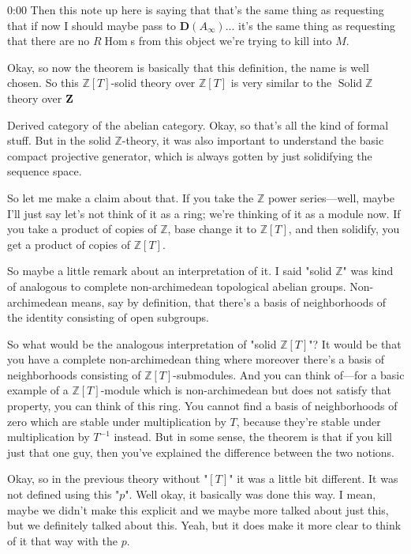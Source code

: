 \begin{unfinished}{0:00}
Then this note up here is saying that that's the same thing as requesting that if now I should maybe pass to $\mathbf{D}(A_\infty)$... it's the same thing as requesting that there are no $R\operatorname{Hom}$s from this object we're trying to kill into $M$.

Okay, so now the theorem is basically that this definition, the name is well chosen. So this $\mathbb{Z}[T]$-solid theory over $\mathbb{Z}[T]$ is very similar to the $\operatorname{Solid} \mathbb{Z}$ theory over $\mathbf Z$

Derived category of the abelian category. Okay, so that's all the kind of formal stuff. But in the solid $\mathbb{Z}$-theory, it was also important to understand the basic compact projective generator, which is always gotten by just solidifying the sequence space.

So let me make a claim about that. If you take the $\mathbb{Z}$ power series---well, maybe I'll just say let's not think of it as a ring; we're thinking of it as a module now. If you take a product of copies of $\mathbb{Z}$, base change it to $\mathbb{Z}[T]$, and then solidify, you get a product of copies of $\mathbb{Z}[T]$.

So maybe a little remark about an interpretation of it. I said "solid $\mathbb{Z}$" was kind of analogous to complete non-archimedean topological abelian groups. Non-archimedean means, say by definition, that there's a basis of neighborhoods of the identity consisting of open subgroups.

So what would be the analogous interpretation of "solid $\mathbb{Z}[T]$"? It would be that you have a complete non-archimedean thing where moreover there's a basis of neighborhoods consisting of $\mathbb{Z}[T]$-submodules. And you can think of---for a basic example of a $\mathbb{Z}[T]$-module which is non-archimedean but does not satisfy that property, you can think of this ring. You cannot find a basis of neighborhoods of zero which are stable under multiplication by $T$, because they're stable under multiplication by $T^{-1}$ instead. But in some sense, the theorem is that if you kill just that one guy, then you've explained the difference between the two notions.

Okay, so in the previous theory without "$[T]$" it was a little bit different. It was not defined using this "$p$". Well okay, it basically was done this way. I mean, maybe we didn't make this explicit and we maybe more talked about just this, but we definitely talked about this. Yeah, but it does make it more clear to think of it that way with the $p$.


\end{unfinished}
